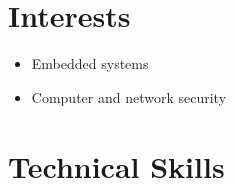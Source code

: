 \documentclass[10pt]{article}
\begin{document}
\section*{Interests}
\begin{itemize}
	\item Embedded systems
	\item Computer and network security
\end{itemize}

\section*{Technical Skills}
\end{document}
